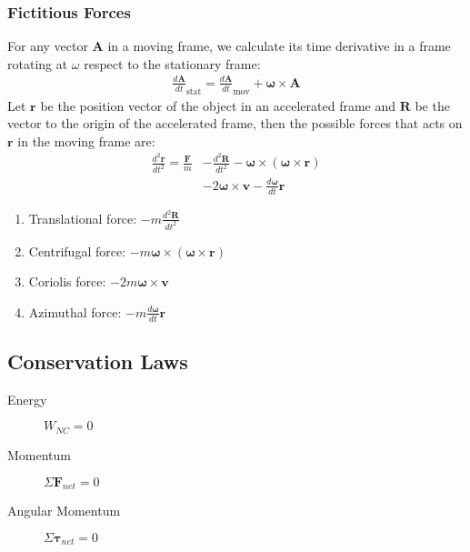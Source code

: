 \documentclass[a4paper]{article}
\newcommand{\ve}[1]{
  \ensuremath{\bm{#1}}}	               %
\begin{document}
\begin{multicols*}{2}
\subsubsection{Fictitious Forces}
For any vector $\ve{A}$ in a moving frame, we calculate its time derivative in a
frame rotating at $\omega$ respect to the stationary frame:
\begin{align*}
  \frac{d\ve{A}}{dt}_{\text{stat}} = \frac{d\ve{A}}{dt}_{\text{mov}} +
  \ve{\omega} \times \ve{A}
\end{align*}
\noindent
Let $\ve{r}$ be the position vector of the object in an accelerated frame and
$\ve{R}$ be the vector to the origin of the accelerated frame, then the possible
forces that acts on $\ve{r}$ in the moving frame are:
\begin{align*}
  \frac{d^2\ve{r}}{dt ^2} = \frac{\ve{F}}{m} &- \frac{d^2\ve{R}}{dt^2}
  - \ve{\omega} \times (\ve{\omega}\times\ve{r})\\
  &- 2\ve{\omega} \times \ve{v} - \frac{d\ve{\omega}}{dt} \ve{r}
\end{align*}
\begin{enumerate}
\item Translational force: $- m\frac{d^2\ve{R}}{dt^2}$
\item Centrifugal force: $-m\ve{\omega} \times (\ve{\omega}\times\ve{r})$
\item Coriolis force: $-2m\ve{\omega} \times \ve{v}$
\item Azimuthal force: $-m \frac{d\ve{\omega}}{dt} \ve{r}$
\end{enumerate}
\subsection{Conservation Laws}
\begin{description}
\item[Energy] $W_{NC} = 0$
\item[Momentum] $\Sigma \ve{F}_{net} = 0$
\item[Angular Momentum] $\Sigma \ve{\tau}_{net} = 0$
\end{description}

\end{multicols*}
\end{document}

